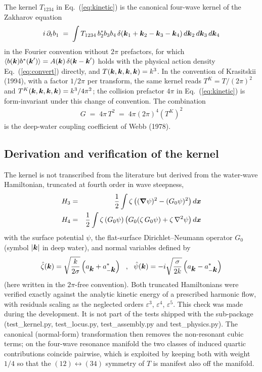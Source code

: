\documentclass[12pt]{article}
\newcommand{\beq}  { \begin{eqnarray} }
\newcommand{\eeq}  { \end{eqnarray}}
\newcommand{\eq }  [1]{Eq.~(\ref{#1})}  %
\renewcommand{\v}[1]{{\mbox{\boldmath$ #1 $}}}  %
\newcommand{\p}{{\partial}}
\newcommand{\vn}{{\v \nabla}}
\newcommand{\lk}{\left(}
\newcommand{\rk}{\right)}
\begin{document}
The kernel $T_{1234}$ in \eq{eq:kinetic} is the canonical four-wave kernel of
the Zakharov equation
\beq \label{eq:zakharov}
 i\, \p_t b_1 \;=\; \int T_{1234}\, b_2^* b_3 b_4\,
 \delta(\v k_1 + \v k_2 - \v k_3 - \v k_4)\, d\v k_2\, d\v k_3\, d\v k_4
\eeq
in the Fourier convention without $2\pi$ prefactors, for which
$\langle b(\v k) b^*(\v k') \rangle = A(\v k)\,\delta(\v k - \v k')$ holds
with the physical action density \eq{eq:convert} directly, and
$T(\v k,\v k,\v k,\v k) = k^3$.
In the convention of Krasitskii (1994), with a factor $1/2\pi$ per transform,
the same kernel reads $T^{K} = T/(2\pi)^2$ and
$T^{K}(\v k,\v k,\v k,\v k) = k^3/4\pi^2$; the collision prefactor $4\pi$
in \eq{eq:kinetic} is form-invariant under this change of convention.
The combination
\beq \label{eq:webb}
 G \;=\; 4\pi\, T^2 \;=\; 4\pi (2\pi)^4 \lk T^{K} \rk^2
\eeq
is the deep-water coupling coefficient of Webb (1978).

\subsection*{Derivation and verification of the kernel}

The kernel is not transcribed from the literature but derived from the
water-wave Hamiltonian, truncated at fourth order in wave steepness,
\beq
 H_3 &=& \frac{1}{2} \int \zeta \lk (\vn \psi)^2 - (G_0 \psi)^2 \rk d\v x \\
 H_4 &=& \frac{1}{2} \int \zeta \, (G_0 \psi)
         \lk G_0 (\zeta\, G_0 \psi) + \zeta \, \nabla^2 \psi \rk d\v x
\eeq
with the surface potential $\psi$, the flat-surface Dirichlet--Neumann
operator $G_0$ (symbol $|\v k|$ in deep water), and normal variables defined by
\beq
 \hat\zeta(\v k) = \sqrt{\frac{k}{2\sigma}} \lk a_{\v k} + a^*_{-\v k} \rk
 ~~,~~
 \hat\psi(\v k) = -i \sqrt{\frac{\sigma}{2 k}} \lk a_{\v k} - a^*_{-\v k} \rk
\eeq
(here written in the $2\pi$-free convention).
Both truncated Hamiltonians were verified exactly against the analytic
kinetic energy of a prescribed harmonic flow, with residuals scaling as the
neglected orders $\varepsilon^3$, $\varepsilon^4$, $\varepsilon^5$.
This check was made during the development. It is not part of the tests
shipped with the sub-package (test\_kernel.py, test\_locus.py,
test\_assembly.py and test\_physics.py).
The canonical (normal-form) transformation then removes the non-resonant
cubic terms; on the four-wave resonance manifold the two classes of induced
quartic contributions coincide pairwise, which is exploited by keeping both
with weight $1/4$ so that the $(12)\!\leftrightarrow\!(34)$ symmetry of $T$
is manifest also off the manifold.
\end{document}
